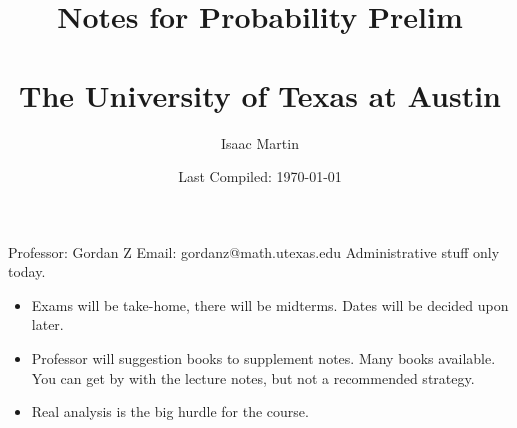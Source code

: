 
\usepackage{indentfirst}

\title{Notes for Probability Prelim \\ \vspace{0.5em}{\Large Fall 2022}\vspace{0.5em}\\ The University of Texas at Austin}
\date{Last Compiled: \today}
\author{Isaac Martin}


\pagestyle{empty}
\maketitle
\newpage
\tableofcontents
\newpage
{} 
Professor: Gordan Z
Email: gordanz@math.utexas.edu
Administrative stuff only today.
\begin{itemize}
  \item Exams will be take-home, there will be midterms. Dates will be decided upon later.
  \item Professor will suggestion books to supplement notes. Many books available. You can get by with the lecture notes, but not a recommended strategy.
  \item Real analysis is the big hurdle for the course.
\end{itemize}
\printbibliography

